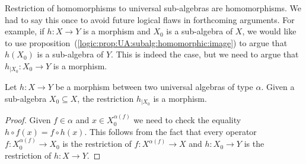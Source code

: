 Restriction of homomorphisms to universal sub-algebras are
homomorphisms. We had to say this once to avoid future logical flaws
in forthcoming arguments. For example, if $h:X\to Y$ is a morphism
and $X_{0}$ is a sub-algebra of $X$, we would like to use
proposition~(\ref{logic:prop:UA:subalg:homomorphic:image}) to argue
that $h(X_{0})$ is a sub-algebra of $Y$. This is indeed the case,
but we need to argue that $h_{|X_{0}}:X_{0}\to Y$ is a morphism.

\begin{prop}\label{logic:prop:UA:subalg:restriction:morphism}
Let $h:X\to Y$ be a morphism  between two universal algebras of type
$\alpha$. Given a sub-algebra $X_{0}\subseteq X$, the restriction
$h_{|X_{0}}$ is a morphism.
\end{prop}
\begin{proof}
Given $f\in\alpha$ and $x\in X_{0}^{\alpha(f)}$ we need to check the
equality $h\circ f(x)=f\circ h(x)$. This follows from the fact that
every operator $f:X_{0}^{\alpha(f)}\to X_{0}$ is the restriction of
$f:X^{\alpha(f)}\to X$ and $h:X_{0}\to Y$ is the restriction of
$h:X\to Y$.
\end{proof}


